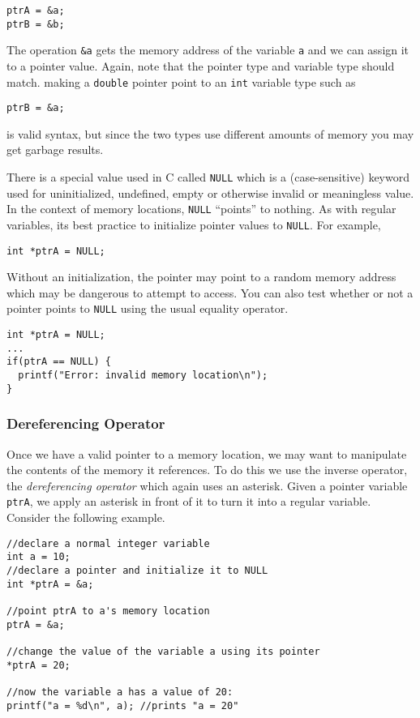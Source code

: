 \begin{verbatim}
ptrA = &a;
ptrB = &b;
\end{verbatim}

The operation \texttt{&a} gets the memory address of the
variable \texttt{a} and we can assign it to a pointer value.
Again, note that the pointer type and variable type should match.
making a \texttt{double} pointer point to an \texttt{int}
variable type such as

\texttt{ptrB = &a;}

is valid syntax, but since the two types use different amounts of memory
you may get garbage results.

There is a special value used in C called \texttt{NULL} which
is a (case-sensitive) keyword used for uninitialized, undefined, empty or otherwise
invalid or meaningless value.  In the context of memory locations, 
\texttt{NULL} ``points'' to nothing.  As with regular variables,
its best practice to initialize pointer values to \texttt{NULL}.
For example, 

\texttt{int *ptrA = NULL;}

Without an initialization, the pointer may point to a random memory
address which may be dangerous to attempt to access.  You can also
test whether or not a pointer points to \texttt{NULL} using the 
usual equality operator.

\begin{verbatim}
int *ptrA = NULL;
...
if(ptrA == NULL) {
  printf("Error: invalid memory location\n");
}
\end{verbatim}

\subsubsection{Dereferencing Operator}

Once we have a valid pointer to a memory location, we may want
to manipulate the contents of the memory it references.  To do this
we use the inverse operator, the \emph{dereferencing operator}
which again uses an asterisk.  Given a pointer variable \texttt{ptrA}, 
we apply an asterisk in front of it to turn it into a regular variable.
Consider the following example.

\begin{verbatim}
//declare a normal integer variable
int a = 10;
//declare a pointer and initialize it to NULL
int *ptrA = &a;

//point ptrA to a's memory location
ptrA = &a;

//change the value of the variable a using its pointer
*ptrA = 20;

//now the variable a has a value of 20:
printf("a = %d\n", a); //prints "a = 20"
\end{verbatim}

